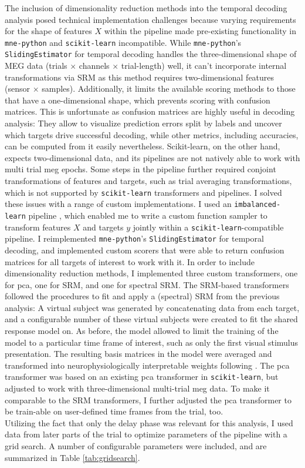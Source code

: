 The inclusion of dimensionality reduction methods into the temporal decoding analysis posed technical implementation challenges because varying requirements for the shape of features $X$ within the pipeline made pre-existing functionality in \texttt{mne-python} and \texttt{scikit-learn} incompatible.
While \texttt{mne-python}'s \texttt{SlidingEstimator} for temporal decoding handles the three-dimensional shape of MEG data (trials $\times$ channels $\times$ trial-length) well, it can't incorporate internal transformations via \gls{SRM} as this method requires two-dimensional features (sensor $\times$ samples).
Additionally, it limits the available scoring methods to those that have a one-dimensional shape, which prevents scoring with confusion matrices.
This is unfortunate as confusion matrices are highly useful in decoding analysis: They allow to visualize prediction errors split by labels and uncover which targets drive successful decoding, while other metrics, including accuracies, can be computed from it easily nevertheless.
Scikit-learn, on the other hand, expects two-dimensional data, and its pipelines are not natively able to work with multi trial \gls{meg} epochs.
Some steps in the pipeline further required conjoint transformations of features and targets, such as trial averaging transformations, which is not supported by \texttt{scikit-learn} transformers and pipelines.
I solved these issues with a range of custom implementations.
I used an \texttt{imbalanced-learn} pipeline \citep{JMLR:v18:16-365}, which enabled me to write a custom function sampler to transform features $X$ and targets $y$ jointly within a \texttt{scikit-learn}-compatible pipeline.
I reimplemented \texttt{mne-python}'s \texttt{SlidingEstimator} for temporal decoding, and implemented custom scorers that were able to return confusion matrices for all targets of interest to work with it.
In order to include dimensionality reduction methods, I implemented three custom transformers, one for \gls{pca}, one for \gls{SRM}, and one for spectral \gls{SRM}.
The \gls{SRM}-based transformers followed the procedures to fit and apply a (spectral) \gls{SRM} from the previous analysis:
A virtual subject was generated by concatenating data from each target, and a configurable number of these virtual subjects were created to fit the shared response model on.
As before, the model allowed to limit the training of the model to a particular time frame of interest, such as only the first visual stimulus presentation.
The resulting basis matrices in the model were averaged and transformed into neurophysiologically interpretable weights following \citet{haufe2014interpretation}.
The \gls{pca} transformer was based on an existing \gls{pca} transformer in \texttt{scikit-learn}, but adjusted to work with three-dimensional multi-trial \gls{meg} data.
To make it comparable to the \gls{SRM} transformers, I further adjusted the \gls{pca} transformer to be train-able on user-defined time frames from the trial, too. \\
Utilizing the fact that only the delay phase was relevant for this analysis, I used data from later parts of the trial to optimize parameters of the pipeline with a grid search.
A number of configurable parameters were included, and are summarized in Table \ref{tab:gridsearch}.

